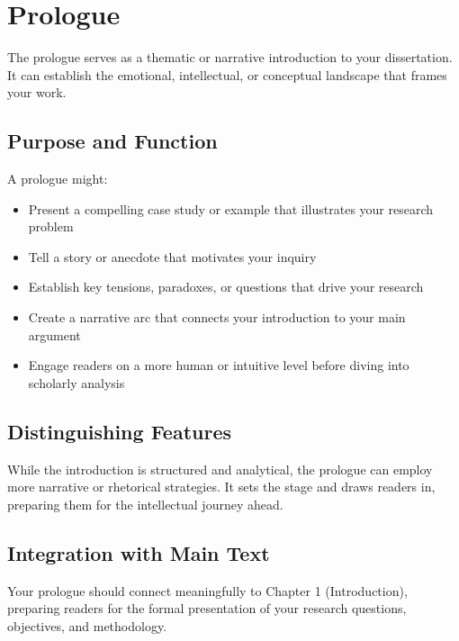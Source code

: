 \chapter*{Prologue}

The prologue serves as a thematic or narrative introduction to your dissertation. It can establish the emotional, intellectual, or conceptual landscape that frames your work.

\section*{Purpose and Function}

A prologue might:
\begin{itemize}
\item Present a compelling case study or example that illustrates your research problem
\item Tell a story or anecdote that motivates your inquiry
\item Establish key tensions, paradoxes, or questions that drive your research
\item Create a narrative arc that connects your introduction to your main argument
\item Engage readers on a more human or intuitive level before diving into scholarly analysis
\end{itemize}

\section*{Distinguishing Features}

While the introduction is structured and analytical, the prologue can employ more narrative or rhetorical strategies. It sets the stage and draws readers in, preparing them for the intellectual journey ahead.

\section*{Integration with Main Text}

Your prologue should connect meaningfully to Chapter 1 (Introduction), preparing readers for the formal presentation of your research questions, objectives, and methodology.

\newpage